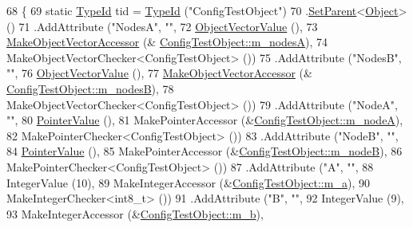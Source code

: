 \begin{DoxyCode}
68 \{
69   \textcolor{keyword}{static} \hyperlink{classns3_1_1TypeId}{TypeId} tid = \hyperlink{classns3_1_1TypeId}{TypeId} (\textcolor{stringliteral}{"ConfigTestObject"})
70     .\hyperlink{classns3_1_1TypeId_abaaca67ab7d2471067e7c275df0f7309}{SetParent}<\hyperlink{classns3_1_1Object}{Object}> ()
71     .AddAttribute (\textcolor{stringliteral}{"NodesA"}, \textcolor{stringliteral}{""},
72                    \hyperlink{classns3_1_1ObjectPtrContainerValue}{ObjectVectorValue} (),
73                    \hyperlink{namespacens3_a6ad5b3621a5dc72b7030cbb07c73adf6}{MakeObjectVectorAccessor} (&
      \hyperlink{classConfigTestObject_a7f4146e9f981f0d51d3c55275dd7f6fa}{ConfigTestObject::m\_nodesA}),
74                    MakeObjectVectorChecker<ConfigTestObject> ())
75     .AddAttribute (\textcolor{stringliteral}{"NodesB"}, \textcolor{stringliteral}{""},
76                    \hyperlink{classns3_1_1ObjectPtrContainerValue}{ObjectVectorValue} (),
77                    \hyperlink{namespacens3_a6ad5b3621a5dc72b7030cbb07c73adf6}{MakeObjectVectorAccessor} (&
      \hyperlink{classConfigTestObject_a345fa2548e1d073ddb0e3c718dedf0a1}{ConfigTestObject::m\_nodesB}),
78                    MakeObjectVectorChecker<ConfigTestObject> ())
79     .AddAttribute (\textcolor{stringliteral}{"NodeA"}, \textcolor{stringliteral}{""},
80                    \hyperlink{classns3_1_1PointerValue}{PointerValue} (),
81                    MakePointerAccessor (&\hyperlink{classConfigTestObject_a5dce1b4faa3a921b41a7636ee25f0424}{ConfigTestObject::m\_nodeA}),
82                    MakePointerChecker<ConfigTestObject> ())
83     .AddAttribute (\textcolor{stringliteral}{"NodeB"}, \textcolor{stringliteral}{""},
84                    \hyperlink{classns3_1_1PointerValue}{PointerValue} (),
85                    MakePointerAccessor (&\hyperlink{classConfigTestObject_ae85745ade88bf5a10e052de02ca688bd}{ConfigTestObject::m\_nodeB}),
86                    MakePointerChecker<ConfigTestObject> ())
87     .AddAttribute (\textcolor{stringliteral}{"A"}, \textcolor{stringliteral}{""},
88                    IntegerValue (10),
89                    MakeIntegerAccessor (&\hyperlink{classConfigTestObject_a3b881f24b876b873471492fe6254509f}{ConfigTestObject::m\_a}),
90                    MakeIntegerChecker<int8\_t> ())
91     .AddAttribute (\textcolor{stringliteral}{"B"}, \textcolor{stringliteral}{""},
92                    IntegerValue (9),
93                    MakeIntegerAccessor (&\hyperlink{classConfigTestObject_acd1425a67fc80dc5d0b9c99d489b7360}{ConfigTestObject::m\_b}),

\end{DoxyCode}
